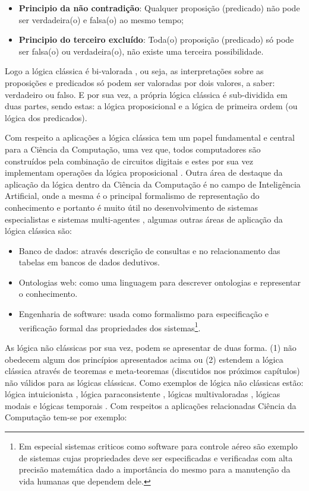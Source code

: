 \begin{itemize}
	\item \textbf{Principio da não contradição}: Qualquer proposição (predicado) não pode ser verdadeira(o) e falsa(o) ao mesmo tempo;
	\item \textbf{Principio do terceiro excluído}: Toda(o) proposição  (predicado) só pode ser falsa(o) ou verdadeira(o), não existe uma terceira possibilidade. 
\end{itemize}

Logo a lógica clássica é bi-valorada \cite{edgar2002}, ou seja, as interpretações sobre as proposições e predicados só podem ser valoradas por dois valores, a saber: verdadeiro ou falso. E por sua vez, a própria lógica clássica é sub-dividida em duas partes, sendo estas: a lógica proposicional e a lógica de primeira ordem (ou lógica dos predicados).

Com respeito a aplicações a lógica clássica tem um papel fundamental e central para a Ciência da Computação, uma vez que, todos computadores são construídos pela combinação de circuitos digitais e estes por sua vez implementam operações da lógica proposicional \cite{abe2002-logica, nunes2008}. Outra área de destaque da aplicação da lógica dentro da Ciência da Computação é no campo de Inteligência Artificial, onde a mesma é o principal formalismo de representação do conhecimento e portanto é muito útil no desenvolvimento de sistemas especialistas e sistemas multi-agentes \cite{BenjaV1}, algumas outras áreas de aplicação da lógica clássica são:

\begin{itemize}
	\item Banco de dados: através descrição de consultas e no relacionamento das
tabelas em bancos de dados dedutivos.
	\item Ontologias web: como uma linguagem para descrever
ontologias e representar o conhecimento.
	\item Engenharia de software: usada como formalismo para especificação e verificação formal das propriedades dos sistemas\footnote{Em especial sistemas criticos como software para controle aéreo são exemplo de sistemas cujas propriedades deve ser especificadas e verificadas com alta precisão matemática dado a importância do mesmo para a manutenção da vida humanas que dependem dele.}.
\end{itemize}

As lógica não clássicas por sua vez, podem se apresentar de duas forma. (1) não obedecem algum dos princípios apresentados acima ou (2) estendem a lógica clássica através de teoremas e meta-teoremas (discutidos nos próximos capítulos) não válidos para as lógicas clássicas. Como exemplos de lógica não clássicas estão: lógica intuicionista \cite{lungarzo1972}, lógica paraconsistente \cite{da2008logica}, lógicas multivaloradas \cite{BenjaV1, magnus2020}, lógicas modais \cite{magnus2020} e lógicas temporais \cite{halpern1983, harel1979, manna1979}. Com respeitos a aplicações relacionadas Ciência da Computação tem-se por exemplo:

